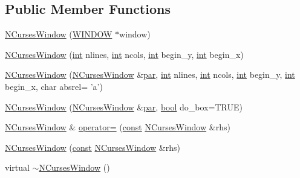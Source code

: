 \subsection*{Public Member Functions}
\begin{DoxyCompactItemize}
\item 
\hyperlink{class_n_curses_window_add6885b98eae08a26ec194571237ce96}{N\-Curses\-Window} (\hyperlink{curses_8priv_8h_aa64cc90e7a4df667d6c7249b77890d39}{W\-I\-N\-D\-O\-W} $\ast$window)
\item 
\hyperlink{class_n_curses_window_aa16a4c86b2dabeafbdc6c3b5ae8fe425}{N\-Curses\-Window} (\hyperlink{term__entry_8h_ad65b480f8c8270356b45a9890f6499ae}{int} nlines, \hyperlink{term__entry_8h_ad65b480f8c8270356b45a9890f6499ae}{int} ncols, \hyperlink{term__entry_8h_ad65b480f8c8270356b45a9890f6499ae}{int} begin\-\_\-y, \hyperlink{term__entry_8h_ad65b480f8c8270356b45a9890f6499ae}{int} begin\-\_\-x)
\item 
\hyperlink{class_n_curses_window_a4f3a7c35666bac46b4d2d79f05dbc550}{N\-Curses\-Window} (\hyperlink{class_n_curses_window}{N\-Curses\-Window} \&\hyperlink{class_n_curses_window_a4e7da34aee4bba11c8d07447b85fcacb}{par}, \hyperlink{term__entry_8h_ad65b480f8c8270356b45a9890f6499ae}{int} nlines, \hyperlink{term__entry_8h_ad65b480f8c8270356b45a9890f6499ae}{int} ncols, \hyperlink{term__entry_8h_ad65b480f8c8270356b45a9890f6499ae}{int} begin\-\_\-y, \hyperlink{term__entry_8h_ad65b480f8c8270356b45a9890f6499ae}{int} begin\-\_\-x, char absrel= 'a')
\item 
\hyperlink{class_n_curses_window_a2ccda26689fa63f7ff27b116fc0243ae}{N\-Curses\-Window} (\hyperlink{class_n_curses_window}{N\-Curses\-Window} \&\hyperlink{class_n_curses_window_a4e7da34aee4bba11c8d07447b85fcacb}{par}, \hyperlink{term__entry_8h_a002004ba5d663f149f6c38064926abac}{bool} do\-\_\-box=T\-R\-U\-E)
\item 
\hyperlink{class_n_curses_window}{N\-Curses\-Window} \& \hyperlink{class_n_curses_window_a403701800693b1d18d124a5be20b62aa}{operator=} (\hyperlink{term__entry_8h_a57bd63ce7f9a353488880e3de6692d5a}{const} \hyperlink{class_n_curses_window}{N\-Curses\-Window} \&rhs)
\item 
\hyperlink{class_n_curses_window_ad326181f10dd9796e506315ea0b09788}{N\-Curses\-Window} (\hyperlink{term__entry_8h_a57bd63ce7f9a353488880e3de6692d5a}{const} \hyperlink{class_n_curses_window}{N\-Curses\-Window} \&rhs)
\item 
virtual \hyperlink{class_n_curses_window_a1721c7139b6defd6e5ea3d3600a9bf46}{$\sim$\-N\-Curses\-Window} ()

\end{DoxyCompactItemize}
